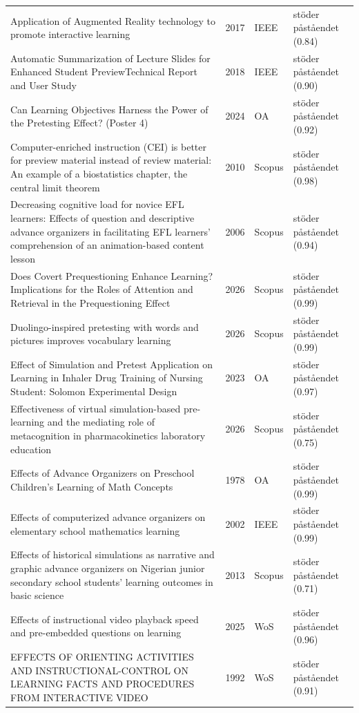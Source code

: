 \begin{longtable}{@{}%
  >{\raggedright\arraybackslash}p{}c%
  >{\raggedright\arraybackslash}p{}%
  >{\raggedright\arraybackslash}p{}@{}}
Application of Augmented Reality technology to promote interactive learning & 2017 & IEEE & stöder påståendet (0.84) \\
Automatic Summarization of Lecture Slides for Enhanced Student PreviewTechnical Report and User Study & 2018 & IEEE & stöder påståendet (0.90) \\
Can Learning Objectives Harness the Power of the Pretesting Effect? (Poster 4) & 2024 & OA & stöder påståendet (0.92) \\
Computer-enriched instruction (CEI) is better for preview material instead of review material: An example of a biostatistics chapter, the central limit theorem & 2010 & Scopus & stöder påståendet (0.98) \\
Decreasing cognitive load for novice EFL learners: Effects of question and descriptive advance organizers in facilitating EFL learners' comprehension of an animation-based content lesson & 2006 & Scopus & stöder påståendet (0.94) \\
Does Covert Prequestioning Enhance Learning? Implications for the Roles of Attention and Retrieval in the Prequestioning Effect & 2026 & Scopus & stöder påståendet (0.99) \\
Duolingo-inspired pretesting with words and pictures improves vocabulary learning & 2026 & Scopus & stöder påståendet (0.99) \\
Effect of Simulation and Pretest Application on Learning in Inhaler Drug Training of Nursing Student: Solomon Experimental Design & 2023 & OA & stöder påståendet (0.97) \\
Effectiveness of virtual simulation-based pre-learning and the mediating role of metacognition in pharmacokinetics laboratory education & 2026 & Scopus & stöder påståendet (0.75) \\
Effects of Advance Organizers on Preschool Children's Learning of Math Concepts & 1978 & OA & stöder påståendet (0.99) \\
Effects of computerized advance organizers on elementary school mathematics learning & 2002 & IEEE & stöder påståendet (0.99) \\
Effects of historical simulations as narrative and graphic advance organizers on Nigerian junior secondary school students' learning outcomes in basic science & 2013 & Scopus & stöder påståendet (0.71) \\
Effects of instructional video playback speed and pre-embedded questions on learning & 2025 & WoS & stöder påståendet (0.96) \\
EFFECTS OF ORIENTING ACTIVITIES AND INSTRUCTIONAL-CONTROL ON LEARNING FACTS AND PROCEDURES FROM INTERACTIVE VIDEO & 1992 & WoS & stöder påståendet (0.91) \\

\end{longtable}
